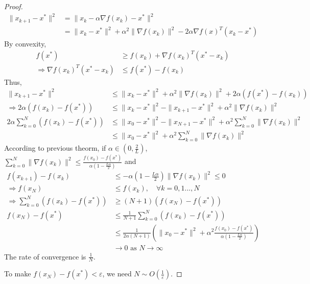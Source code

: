 \documentclass[11pt,a4paper]{article}
\begin{document}
\begin{proof}
\begin{equation}
    \begin{aligned}
        \|x_{k+1}-x^*\|^2&=\|x_k-\alpha \nabla f(x_k)-x^*\|^2\\
        &=\|x_k-x^*\|^2+\alpha^2\|\nabla f(x_k)\|^2-2\alpha \nabla f(x)^T(x_k-x^*)
    \end{aligned}
    \nonumber
\end{equation}
By convexity,
\begin{equation}
    \begin{aligned}
        f(x^*)&\geq f(x_k)+\nabla f(x_k)^T(x^*-x_k)\\
        \Rightarrow	\nabla f(x_k)^T(x^*-x_k)&\leq f(x^*)-f(x_k)
    \end{aligned}
    \nonumber
\end{equation}
Thus,
\begin{equation}
    \begin{aligned}
        \|x_{k+1}-x^*\|^2&\leq \|x_k-x^*\|^2+\alpha^2\|\nabla f(x_k)\|^2+2\alpha (f(x^*)-f(x_k))\\
        \Rightarrow 2\alpha (f(x_k)-f(x^*))&\leq \|x_k-x^*\|^2-\|x_{k+1}-x^*\|^2+\alpha^2\|\nabla f(x_k)\|^2\\
        2\alpha\sum_{k=0}^N (f(x_k)-f(x^*))&\leq \|x_0-x^*\|^2-\|x_{N+1}-x^*\|^2+\alpha^2\sum_{k=0}^N\|\nabla f(x_k)\|^2\\
        &\leq \|x_0-x^*\|^2+\alpha^2\sum_{k=0}^N\|\nabla f(x_k)\|^2
    \end{aligned}
    \nonumber
\end{equation}
According to previous theorm, if $\alpha\in (0,\frac{2}{L})$, $\sum_{k=0}^N\|\nabla f(x_k)\|^2\leq \frac{f(x_0)-f(x^*)}{\alpha(1-\frac{L\alpha}{2})}$ and
\begin{equation}
    \begin{aligned}
        f(x_{k+1})-f(x_k)&\leq-\alpha (1-\frac{L\alpha}{2})\|\nabla f(x_k)\|^2\leq 0\\
        \Rightarrow	f(x_N)&\leq f(x_k),\quad \forall k=0,1...,N\\
        \Rightarrow	\sum_{k=0}^N(f(x_k)-f(x^*))&\geq (N+1)(f(x_N)-f(x^*))\\
        f(x_N)-f(x^*)&\leq \frac{1}{N+1}\sum_{k=0}^N(f(x_k)-f(x^*))\\
        &\leq \frac{1}{2\alpha(N+1)}(\|x_0-x^*\|^2+\alpha^2\frac{f(x_0)-f(x^*)}{\alpha(1-\frac{L\alpha}{2})})\\
        &\rightarrow 0 \text{ as }N \rightarrow	\infty
    \end{aligned}
    \nonumber
\end{equation}
The rate of convergence is $\frac{1}{N}$.

To make $f(x_N)-f(x^*)<\varepsilon$, we need $N\sim O(\frac{1}{\varepsilon})$.
\end{proof}
\end{document}
